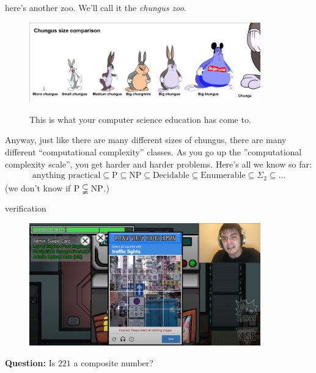 \documentclass{beamer}
\begin{document}
\begin{frame}{here's another zoo.}
We'll call it the \textit{chungus zoo}.

\begin{figure}[h]
\centering
\includegraphics[width=10cm]{img/chungus_sizes.png}

This is what your computer science education has come to.
\end{figure}

Anyway, just like there are many different sizes of chungus, there are many different ``computational complexity'' classes. As you go up the ''computational complexity scale'', you get harder and harder problems. Here's all we know so far:
\begin{align*}
\text{anything practical} \subseteq \text{P} \subseteq \text{NP} \subseteq \text{Decidable} \subseteq \text{Enumerable} \subseteq \Sigma_2 \subseteq \ldots
\end{align*}
(we don't know if $\text P \subsetneqq \text{NP}$.)
\end{frame}

\begin{frame}{verification}
\begin{figure}[h]
\centering
\includegraphics[width=10cm]{img/verify.png}
\end{figure}
\textbf{Question:} Is $221$ a composite number?
\end{frame}
\end{document}
